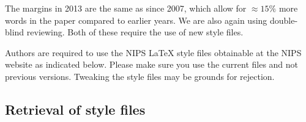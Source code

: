 \documentclass{article} %
\begin{document}
The margins in 2013 are the same as since 2007, which allow for $\approx 15\%$
more words in the paper compared to earlier years. We are also again using
double-blind reviewing. Both of these require the use of new style files.

Authors are required to use the NIPS \LaTeX{} style files obtainable at the
NIPS website as indicated below. Please make sure you use the current files and
not previous versions. Tweaking the style files may be grounds for rejection.








\subsection{Retrieval of style files}
\end{document}

